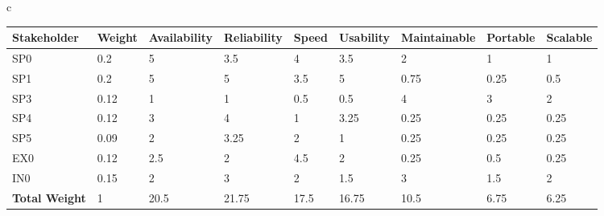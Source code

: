 \begin{table}{c}
	\centering
	\begin{tabular}{|l|l|l|l|l|l|l|l|l|} 
		\hline
		\textbf{Stakeholder}  & \textbf{Weight} & \textbf{Availability} & \textbf{Reliability} & \textbf{Speed} & \textbf{Usability} & \textbf{Maintainable} & \textbf{Portable} & \textbf{Scalable}  \\ 
		\hline
		SP0                   & 0.2             & 5                     & 3.5                  & 4              & 3.5                & 2                     & 1                 & 1                  \\ 
		\hline
		SP1                   & 0.2             & 5                     & 5                    & 3.5            & 5                  & 0.75                  & 0.25              & 0.5                \\ 
		\hline
		SP3                   & 0.12            & 1                     & 1                    & 0.5            & 0.5                & 4                     & 3                 & 2                  \\ 
		\hline
		SP4                   & 0.12            & 3                     & 4                    & 1              & 3.25               & 0.25                  & 0.25              & 0.25               \\ 
		\hline
		SP5                   & 0.09            & 2                     & 3.25                 & 2              & 1                  & 0.25                  & 0.25              & 0.25               \\ 
		\hline
		EX0                   & 0.12            & 2.5                   & 2                    & 4.5            & 2                  & 0.25                  & 0.5               & 0.25               \\ 
		\hline
		IN0                   & 0.15            & 2                     & 3                    & 2              & 1.5                & 3                     & 1.5               & 2                  \\ 
		\hline
		\textbf{Total Weight} & 1               & 20.5                  & 21.75                & 17.5           & 16.75              & 10.5                  & 6.75              & 6.25               \\
		\hline
	\end{tabular}
\end{table}